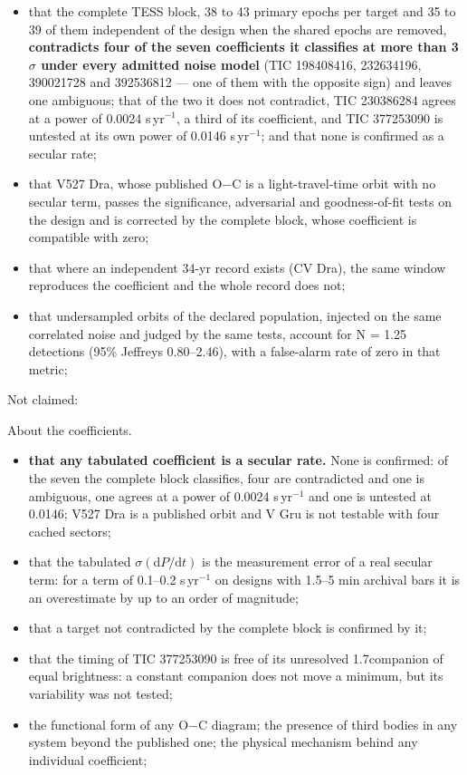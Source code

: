 \documentclass{aa}
\begin{document}
\begin{itemize}
\item that the complete TESS block, 38 to 43 primary epochs per target and 35 to 39 of them independent of the design when the shared epochs are removed, \textbf{contradicts four of the seven coefficients it classifies at more than 3$\sigma$ under every admitted noise model} (TIC 198408416, 232634196, 390021728 and 392536812 --- one of them with the opposite sign) and leaves one ambiguous; that of the two it does not contradict, TIC 230386284 agrees at a power of 0.0024 s\,yr$^{-1}$, a third of its coefficient, and TIC 377253090 is untested at its own power of 0.0146 s\,yr$^{-1}$; and that none is confirmed as a secular rate;
\item that V527 Dra, whose published O$-$C is a light-travel-time orbit with no secular term, passes the significance, adversarial and goodness-of-fit tests on the design and is corrected by the complete block, whose coefficient is compatible with zero;
\item that where an independent 34-yr record exists (CV Dra), the same window reproduces the coefficient and the whole record does not;
\item that undersampled orbits of the declared population, injected on the same correlated noise and judged by the same tests, account for N = 1.25 detections (95\% Jeffreys 0.80--2.46), with a false-alarm rate of zero in that metric;
\end{itemize}

Not claimed:

About the coefficients.

\begin{itemize}
\item \textbf{that any tabulated coefficient is a secular rate.} None is confirmed: of the seven the complete block classifies, four are contradicted and one is ambiguous, one agrees at a power of 0.0024 s\,yr$^{-1}$ and one is untested at 0.0146; V527 Dra is a published orbit and V Gru is not testable with four cached sectors;
\item that the tabulated $\sigma(\mathrm{d}P/\mathrm{d}t)$ is the measurement error of a real secular term: for a term of 0.1--0.2 s\,yr$^{-1}$ on designs with 1.5--5 min archival bars it is an overestimate by up to an order of magnitude;
\item that a target not contradicted by the complete block is confirmed by it;
\item that the timing of TIC 377253090 is free of its unresolved 1.7\arcsec companion of equal brightness: a constant companion does not move a minimum, but its variability was not tested;
\item the functional form of any O$-$C diagram; the presence of third bodies in any system beyond the published one; the physical mechanism behind any individual coefficient;
\end{itemize}
\end{document}
